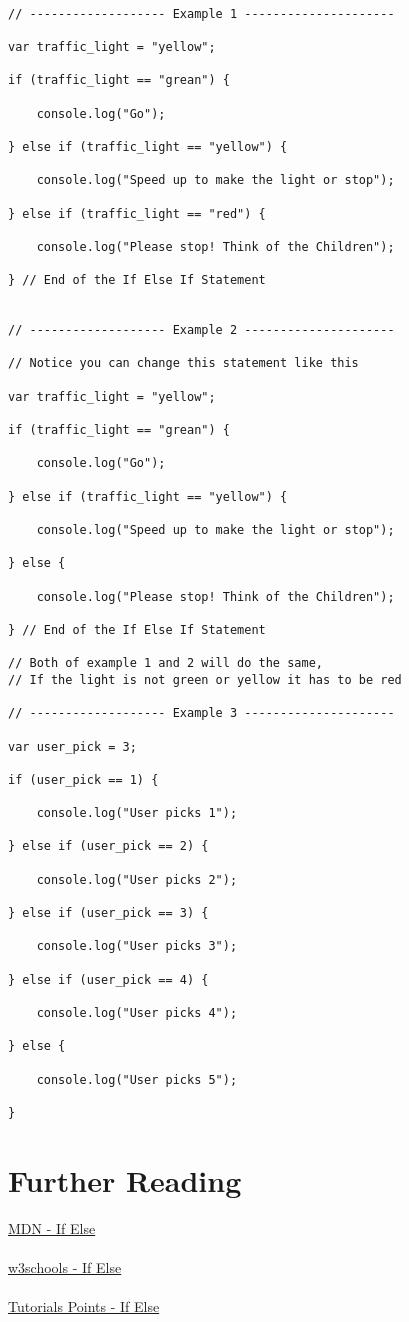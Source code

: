 \documentclass[12pt, letterpaper]{article}
\begin{document}
\begin{lstlisting}

// ------------------- Example 1 ---------------------

var traffic_light = "yellow";

if (traffic_light == "grean") {

	console.log("Go");

} else if (traffic_light == "yellow") {

	console.log("Speed up to make the light or stop");

} else if (traffic_light == "red") {

	console.log("Please stop! Think of the Children");

} // End of the If Else If Statement


// ------------------- Example 2 ---------------------

// Notice you can change this statement like this

var traffic_light = "yellow";

if (traffic_light == "grean") {

	console.log("Go");

} else if (traffic_light == "yellow") {

	console.log("Speed up to make the light or stop");

} else {

	console.log("Please stop! Think of the Children");

} // End of the If Else If Statement

// Both of example 1 and 2 will do the same,
// If the light is not green or yellow it has to be red

// ------------------- Example 3 ---------------------

var user_pick = 3;

if (user_pick == 1) {

	console.log("User picks 1");

} else if (user_pick == 2) {

	console.log("User picks 2");

} else if (user_pick == 3) {

	console.log("User picks 3");

} else if (user_pick == 4) {

	console.log("User picks 4");

} else {

	console.log("User picks 5");	

}
\end{lstlisting}

\section*{Further Reading}

\href{https://developer.mozilla.org/en-US/docs/Web/JavaScript/Reference/Statements/if...else}{MDN - If Else}\\
\\
\href{http://www.w3schools.com/js/js_if_else.asp}{w3schools - If Else}\\
\\
\href{https://www.tutorialspoint.com/javascript/javascript_ifelse.htm}{Tutorials Points - If Else}
\end{document}

